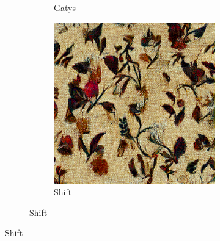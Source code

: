 \begin{figure}[ht]
\begin{subfigure}{0.8\textwidth}
\begin{subfigure}{0.32\textwidth}
            \caption{Gatys}
            \label{fig:methods_comparison_large-vanilla}
        \end{subfigure}
        \hfill
        \begin{subfigure}{0.32\textwidth}
            \centering
            \includegraphics[width=\textwidth]{images/03-comparison_large_shift.jpg}
            \caption{Shift}
            \label{fig:methods_comparison_large-shift}
        \end{subfigure}
        

\end{subfigure}
\end{figure}
